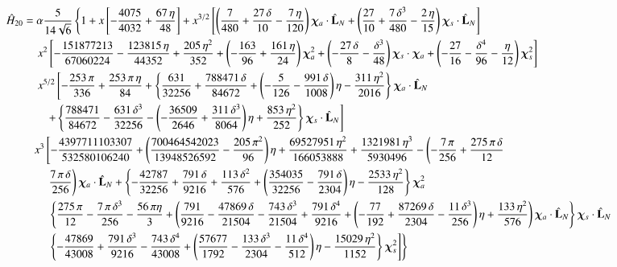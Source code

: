 \documentclass[prd,preprintnumbers,twocolumn,eqsecnum,floatfix,letter]{revtex4}
\begin{document}
\begin{widetext}
\begin{align}\label{eq:H20}
\hat{H}_{20} &= \alpha \frac{5}{14\sqrt{6}}\left\{ 1 + x\left[-\frac{4075}{4032} + \frac{67 \, \eta}{48}\right]+ x^{3/2}\left[\left(\frac{7}{480} +\frac{27 \, \delta}{10} - \frac{7 \,\eta}{120}\right)\bm{\chi}_a \cdot \hat{\mathbf{L}}_N+\left(\frac{27}{10} +\frac{7 \, \delta^3}{480} - \frac{2 \, \eta}{15}\right)\bm{\chi}_s \cdot \hat{\mathbf{L}}_N\right]\right. \nonumber \\
& \quad \left. x^2\left[-\frac{151877213}{67060224} -\frac{123815 \, \eta}{44352} +\frac{205 \, \eta^2}{352} +\left(-\frac{163}{96} +\frac{161 \, \eta}{24}\right)\bm{\chi}_a^2 + \left(-\frac{27 \, \delta}{8} -\frac{\delta^3}{48}\right)\bm{\chi}_s \cdot \bm{\chi}_a + \left(-\frac{27}{16}-\frac{\delta^4}{96} -\frac{\eta}{12}\right)\bm{\chi}_s^2\right]\right. \nonumber \\
& \quad \left. x^{5/2}\left[-\frac{253 \, \pi}{336}+ \frac{253 \, \pi \, \eta}{84} +\left\{\frac{631}{32256} + \frac{788471\,\delta}{84672} +\left(-\frac{5}{126}-\frac{991\,\delta}{1008}\right)\eta-\frac{311\,\eta^2}{2016}\right\}\bm{\chi}_a \cdot \hat{\mathbf{L}}_N\right.\right. \nonumber\\
& \qquad\left. +\left\{\frac{788471}{84672}-\frac{631\, \delta^3}{32256} -\left(-\frac{36509}{2646} + \frac{311\,\delta^3}{8064}\right)\eta+\frac{853\,\eta^2}{252}\right\}\bm{\chi}_s \cdot \hat{\mathbf{L}}_N\right] \nonumber \\
& \quad  x^3\left[-\frac{4397711103307}{532580106240} + \left( \frac{700464542023}{13948526592} - \frac{205 \, \pi^2}{96}\right)\eta + \frac{69527951 \, \eta^2}{166053888} + \frac{1321981 \, \eta^3}{5930496} -  \left(-\frac{7\,\pi}{256} + \frac{275\,\pi\,\delta}{12} \right.\right. \nonumber \\
& \qquad \left. \frac{7 \, \pi\,\delta}{256}\right)\bm{\chi}_a \cdot \hat{\mathbf{L}}_N + \left\{-\frac{42787}{32256} + \frac{791\,\delta}{9216} +\frac{113\,\delta^2}{576} + \left(\frac{354035}{32256} -\frac{791\,\delta}{2304}\right)\eta - \frac{2533\,\eta^2}{128}\right\}\bm{\chi}_a^2\nonumber\\
&\qquad \left.\left. \left\{\frac{275\,\pi}{12} -\frac{7\,\pi\,\delta^3}{256}-\frac{56\,\pi\eta}{3} + \left(\frac{791}{9216} -\frac{47869\,\delta}{21504}-\frac{743\,\delta^3}{21504} + \frac{791\,\delta^4}{9216} + \left(-\frac{77}{192}+\frac{87269\, \delta}{2304}-\frac{11\, \delta^3}{256}\right)\eta + \frac{133\,\eta^2}{576}\right)\bm{\chi}_a \cdot \hat{\mathbf{L}}_N\right\}\bm{\chi}_s \cdot \hat{\mathbf{L}}_N\right.\right.\nonumber\\
& \qquad \left.\left.\left\{-\frac{47869}{43008} + \frac{791\,\delta^3}{9216} -\frac{743\,\delta^4}{43008} + \left(\frac{57677}{1792} -\frac{133\,\delta^3}{2304} -\frac{11\,\delta^4}{512}\right)\eta - \frac{15029\,\eta^2}{1152}\right\}\bm{\chi}_s^2
\right]\right\}
\end{align}



\end{widetext}
\end{document}
